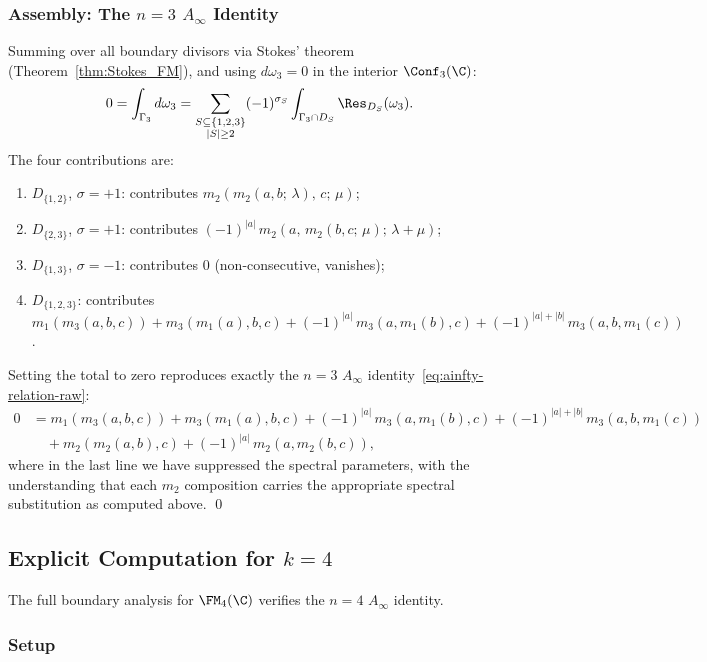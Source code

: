 \subsubsection{Assembly: The $n=3$ $A_\infty$ Identity}

\begin{proposition}[$k=3$ Stasheff identity]
\label{prop:k3_identity}
Summing over all boundary divisors via Stokes' theorem (Theorem~\ref{thm:Stokes_FM}), and using $d\omega_3 = 0$ in the interior $\Conf_3(\C)$:
\[
0 = \int_{\Gamma_3} d\omega_3 = \sum_{\substack{S \subseteq \{1,2,3\} \\ |S| \geq 2}} (-1)^{\sigma_S} \int_{\Gamma_3 \cap D_S} \Res_{D_S}(\omega_3).
\]
The four contributions are:
\begin{enumerate}[label=(\roman*)]
\item $D_{\{1,2\}}$, $\sigma = +1$: contributes $m_2(m_2(a,b;\,\lambda),\, c;\, \mu)$;
\item $D_{\{2,3\}}$, $\sigma = +1$: contributes $(-1)^{|a|}\, m_2(a,\, m_2(b,c;\,\mu);\, \lambda+\mu)$;
\item $D_{\{1,3\}}$, $\sigma = -1$: contributes $0$ (non-consecutive, vanishes);
\item $D_{\{1,2,3\}}$: contributes $m_1(m_3(a,b,c)) + m_3(m_1(a),b,c) + (-1)^{|a|}\, m_3(a,m_1(b),c) + (-1)^{|a|+|b|}\, m_3(a,b,m_1(c))$.
\end{enumerate}
Setting the total to zero reproduces exactly the $n=3$ $A_\infty$ identity~\eqref{eq:ainfty-relation-raw}:
\begin{align*}
0 &= m_1(m_3(a,b,c)) + m_3(m_1(a),b,c) + (-1)^{|a|}\, m_3(a,m_1(b),c) + (-1)^{|a|+|b|}\, m_3(a,b,m_1(c)) \\
&\quad + m_2(m_2(a,b),c) + (-1)^{|a|}\, m_2(a,m_2(b,c)),
\end{align*}
where in the last line we have suppressed the spectral parameters, with the understanding that each $m_2$ composition carries the appropriate spectral substitution as computed above. \qed
\end{proposition}

\subsection{Explicit Computation for $k=4$}
\label{subsec:k4_computation}

The full boundary analysis for $\FM_4(\C)$ verifies the $n=4$ $A_\infty$ identity.

\subsubsection{Setup}

